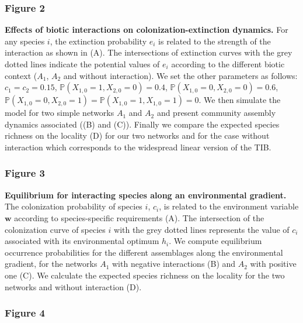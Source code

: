 \newpage

\subsubsection*{Figure 2}

\textbf{Effects of biotic interactions on colonization-extinction dynamics.} For any species $i$, the extinction probability $e_i$ is related to the strength of the interaction as shown in (A). The intersections of extinction curves with the grey dotted lines indicate the potential values of $e_i$ according to the different biotic context ($A_1$, $A_2$ and without interaction). We set the other parameters as follows: $c_1=c_2=0.15$, $\mathbb{P}(X_{1,0}=1 , X_{2,0}=0)=0.4$, $\mathbb{P}(X_{1,0}=0 , X_{2,0}=0)=0.6$, $\mathbb{P}(X_{1,0}=0 , X_{2,0}=1)=\mathbb{P}(X_{1,0}=1 , X_{1,0}=1)=0$. We then simulate the model for two simple networks $A_1$ and $A_2$ and present community assembly dynamics associated ((B) and (C)). Finally we compare the expected species richness on the locality (D) for our two networks and for the case without interaction which corresponds to the widespread linear version of the TIB.

\newpage


\subsubsection*{Figure 3}

\textbf{Equilibrium for interacting species along an environmental gradient.} The colonization probability of species $i$, $c_i$, is related to the environment variable $\mathbf{w}$ according to species-specific requirements (A). The intersection of the colonization curve of species $i$ with the grey dotted lines represents the value of $c_i$ associated with its environmental optimum $h_i$. We compute equilibrium occurrence probabilities for the different assemblages along the environmental gradient, for the networks $A_1$ with negative interactions (B) and $A_2$ with positive one (C). We calculate the expected species richness on the locality for the two networks and without interaction (D).

\newpage


\subsubsection*{Figure 4}

